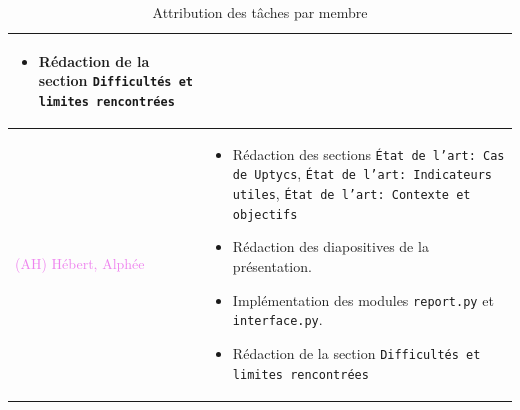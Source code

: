 \begin{table}[H]
\begin{tabularx}{\textwidth}{|l|X|}
\begin{itemize}
            \item Rédaction de la section \texttt{Difficultés et limites rencontrées}
        \end{itemize} \\
        \hline
        \textcolor{violet}{(AH) Hébert, Alphée} & 
        \begin{itemize}
            \item Rédaction des sections \texttt{État de l'art: Cas de Uptycs}, \texttt{État de l'art: Indicateurs utiles}, \texttt{État de l'art: Contexte et objectifs}
            \item Rédaction des diapositives de la présentation.
            \item Implémentation des modules \texttt{report.py} et \texttt{interface.py}.
            \item Rédaction de la section \texttt{Difficultés et limites rencontrées}
        \end{itemize} \\
        \hline
    \end{tabularx}
    \caption{Attribution des tâches par membre}
    \label{tab:attribution}
\end{table}